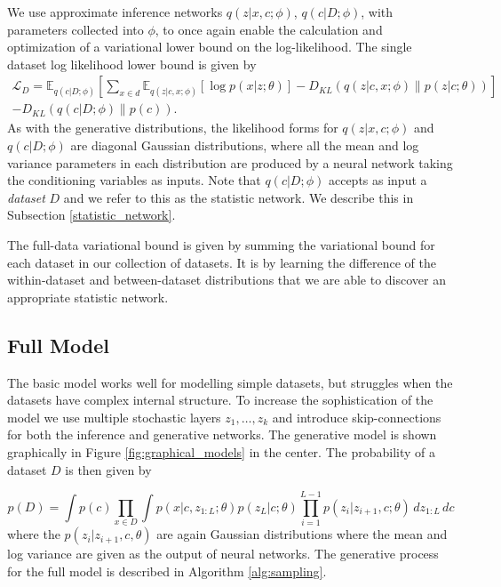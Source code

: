 \documentclass{article} \usepackage{iclr2017_conference,times}
\newcommand{\KL}[2]{D_{KL} \left (#1 \| #2 \right )}
\begin{document}
We use approximate inference networks $q(z |x, c;\phi)$, $q(c | D ; \phi)$, with parameters collected into $\phi$, to once again enable the calculation and optimization of a variational lower bound on the log-likelihood. The single dataset log likelihood lower bound is given by
\begin{multline}
      \mathcal{L}_D = \mathbb{E}_{q(c | D;\phi)} \left [ \sum_{x \in d} \mathbb{E}_{q(z|c,x ;\phi)} \left [  \log p(x|z ;\theta) \right ]  -\KL{q(z | c,x ;\phi)}{p(z | c ; \theta)} \right ]  \\ - \KL{q(c | D ; \phi)}{p(c)}.
\end{multline}
As with the generative distributions, the likelihood forms for $q(z |x, c;\phi)$ and $q(c | D ; \phi)$ are diagonal Gaussian distributions, where all the mean and log variance parameters in each distribution are produced by a neural network taking the conditioning variables as inputs. Note that $q(c | D; \phi)$ accepts as input a \emph{dataset} $D$ and we refer to this as the statistic network. We describe this in Subsection \ref{statistic_network}. 

The full-data variational bound is given by summing the variational bound for each dataset in our collection of datasets. It is by learning the difference of the within-dataset and between-dataset distributions that we are able to discover an appropriate statistic network.

\subsection{Full Model}

The basic model works well for modelling simple datasets, but struggles when the datasets have complex internal structure. To increase the sophistication of the model we use multiple stochastic layers $z_1, \dots, z_k$ and introduce skip-connections for both the inference and generative networks. The generative model is shown graphically in Figure \ref{fig:graphical_models} in the center. The probability of a dataset $D$ is then given by

\begin{equation}
    p(D) = \int p(c) \prod_{x \in D} \int p(x|c,z_{1:L}; \theta) p(z_L | c ; \theta) \prod_{i=1}^{L-1}p(z_{i} | z_{i+1},c ; \theta)\, dz_{1:L} \, dc
\end{equation}
where the $p(z_i | z_{i+1}, c, \theta)$ are again Gaussian distributions where the mean and log variance are given as the output of neural networks. The generative process for the full model is described in Algorithm \ref{alg:sampling}.
\end{document}
